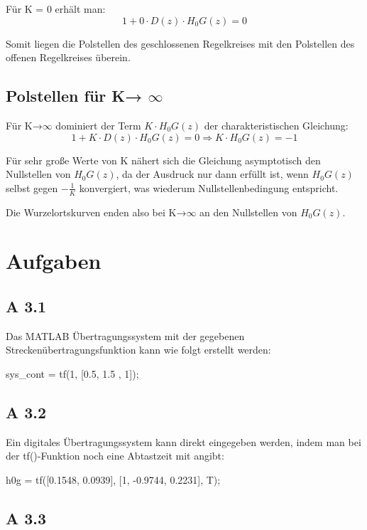 Für K = 0 erhält man:
\begin{equation*}
	1+0\cdot D(z)\cdot H_0G(z) = 0
\end{equation*}

Somit liegen die Polstellen des geschlossenen Regelkreises mit den Polstellen des offenen Regelkreises überein.

\section{Polstellen für K→ $\infty$}

Für K→$\infty$ dominiert der Term $K\cdot H_0G(z)$ der charakteristischen Gleichung: 
\begin{equation*}
	1+K\cdot D(z)\cdot H_0G(z) = 0 \Longrightarrow K\cdot H_0G(z) = -1
\end{equation*}

Für sehr große Werte von K nähert sich die Gleichung asymptotisch den Nullstellen von $H_0G(z)$, da der Ausdruck nur dann erfüllt ist, wenn $H_0G(z)$ selbst gegen $-\frac{1}{K}$ konvergiert, was wiederum Nullstellenbedingung entspricht.

Die Wurzelortskurven enden also bei K→$\infty$ an den Nullstellen von $H_0G(z)$.


\chapter{Aufgaben}

\section*{A 3.1}
Das MATLAB Übertragungssystem mit der gegebenen Streckenübertragungsfunktion kann wie folgt erstellt werden:
\begin{center}
	sys\_cont = tf(1, [0.5, 1.5 , 1]);
\end{center}

\section*{A 3.2}
Ein digitales Übertragungssystem kann direkt eingegeben werden, indem man bei der tf()-Funktion noch eine Abtastzeit mit angibt: 
\begin{center}
	h0g = tf([0.1548, 0.0939], [1, -0.9744, 0.2231], T);
\end{center}

\section*{A 3.3}

